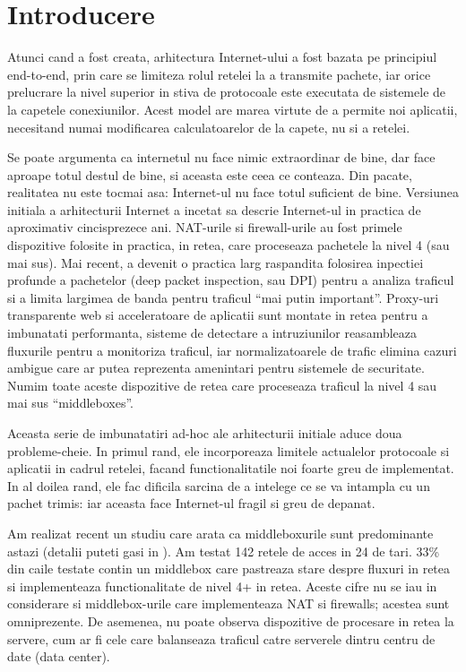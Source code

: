 
\chapter{Introducere}

Atunci cand a fost creata, arhitectura Internet-ului a fost bazata pe
principiul end-to-end, prin care se limiteza rolul retelei la a
transmite pachete, iar orice prelucrare la nivel superior in stiva de
protocoale este executata de sistemele de la capetele
conexiunilor. Acest model are marea virtute de a permite noi
aplicatii, necesitand numai modificarea calculatoarelor de la capete,
nu si a retelei.

Se poate argumenta ca internetul nu face nimic extraordinar de bine,
dar face aproape totul destul de bine, si aceasta este ceea ce
conteaza. Din pacate, realitatea nu este tocmai asa: Internet-ul nu
face totul suficient de bine.  Versiunea initiala a arhitecturii
Internet a incetat sa descrie Internet-ul in practica de aproximativ
cincisprezece ani.  NAT-urile si firewall-urile au fost primele
dispozitive folosite in practica, in retea, care proceseaza pachetele
la nivel 4 (sau mai sus).  Mai recent, a devenit o practica larg
raspandita folosirea inpectiei profunde a pachetelor (deep packet
inspection, sau DPI) pentru a analiza traficul si a limita largimea de
banda pentru traficul ``mai putin important''.  Proxy-uri transparente
web si acceleratoare de aplicatii sunt montate in retea pentru a
imbunatati performanta, sisteme de detectare a intruziunilor
reasambleaza fluxurile pentru a monitoriza traficul, iar
normalizatoarele de trafic elimina cazuri ambigue care ar putea
reprezenta amenintari pentru sistemele de securitate. Numim toate
aceste dispozitive de retea care proceseaza traficul la nivel 4 sau
mai sus ``middleboxes''.

Aceasta serie de imbunatatiri ad-hoc ale arhitecturii initiale aduce
doua probleme-cheie. In primul rand, ele incorporeaza limitele
actualelor protocoale si aplicatii in cadrul retelei, facand
functionalitatile noi foarte greu de implementat.  In al doilea rand,
ele fac dificila sarcina de a intelege ce se va intampla cu un pachet
trimis: iar aceasta face Internet-ul fragil si greu de depanat.

Am realizat recent un studiu care arata ca middleboxurile sunt
predominante astazi (detalii puteti gasi in \cite{imc}). Am testat 142
retele de acces in 24 de tari. 33\% din caile testate contin un
middlebox care pastreaza stare despre fluxuri in retea si
implementeaza functionalitate de nivel 4+ in retea. Aceste cifre nu se
iau in considerare si middlebox-urile care implementeaza NAT si
firewalls; acestea sunt omniprezente. De asemenea, nu poate observa
dispozitive de procesare in retea la servere, cum ar fi cele care
balanseaza traficul catre serverele dintru centru de date (data
center).

